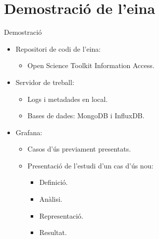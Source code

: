 \section{Demostració de l'eina}\label{sec:demo}

\begin{frame}{Demostració}

\begin{itemize}
    \item Repositori de codi de l'eina:
    \begin{itemize}
        \item Open Science Toolkit Information Access.
    \end{itemize}
    \item Servidor de treball:
    \begin{itemize}
        \item Logs i metadades en local.
        \item Bases de dades: MongoDB i InfluxDB.
    \end{itemize}
    \item Grafana:
    \begin{itemize}
        \item Casos d'ús previament presentats.
        \item Presentació de l'estudi d'un cas d'ús nou:
        \begin{itemize}
            \item Definició.
            \item Anàlisi.
            \item Representació.
            \item Resultat.
        \end{itemize}
    \end{itemize}
\end{itemize}

\end{frame}
